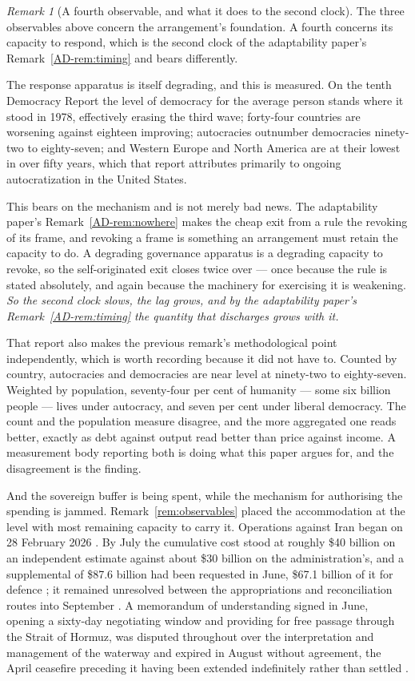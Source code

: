 \documentclass[11pt,a4paper]{article}
\theoremstyle{remark}
\newtheorem{remark}[definition]{Remark}
\begin{document}
\begin{remark}[A fourth observable, and what it does to the second clock]\label{rem:governance}
The three observables above concern the arrangement's foundation. A fourth concerns its capacity to
respond, which is the second clock of the adaptability paper's Remark~\ref{AD-rem:timing} and bears differently.

The response apparatus is itself degrading, and this is measured. On the tenth Democracy Report
\citep{vdem2026} the level of democracy for the average person stands where it stood in 1978, effectively
erasing the third wave; forty-four countries are worsening against eighteen improving; autocracies
outnumber democracies ninety-two to eighty-seven; and Western Europe and North America are at their
lowest in over fifty years, which that report attributes primarily to ongoing autocratization in the
United States.

This bears on the mechanism and is not merely bad news. The adaptability paper's Remark~\ref{AD-rem:nowhere} makes the cheap
exit from a rule the revoking of its frame, and revoking a frame is something an arrangement must retain
the capacity to do. A degrading governance apparatus is a degrading capacity to revoke, so the
self-originated exit closes twice over --- once because the rule is stated absolutely, and again because
the machinery for exercising it is weakening. \emph{So the second clock slows, the lag grows, and by
the adaptability paper's Remark~\ref{AD-rem:timing} the quantity that discharges grows with it.}

That report also makes the previous remark's methodological point independently, which is worth
recording because it did not have to. Counted by country, autocracies and democracies are near level at
ninety-two to eighty-seven. Weighted by population, seventy-four per cent of humanity --- some six
billion people --- lives under autocracy, and seven per cent under liberal democracy. The count and
the population measure disagree, and the more aggregated one reads better, exactly as debt against
output read better than price against income. A measurement body reporting both is doing what this paper
argues for, and the disagreement is the finding.

And the sovereign buffer is being spent, while the mechanism for authorising the spending is
jammed. Remark~\ref{rem:observables} placed the accommodation at the level with most remaining capacity
to carry it. Operations against Iran began on 28 February 2026 \citep{crs2026}. By July the cumulative
cost stood at roughly \$40 billion on an independent estimate against about \$30 billion on the
administration's, and a supplemental of \$87.6 billion had been requested in June, \$67.1 billion of it
for defence \citep{csis2026}; it remained unresolved between the appropriations and reconciliation routes
into September \citep{csistracking2026}. A memorandum of understanding signed in June, opening a
sixty-day negotiating window and providing for free passage through the Strait of Hormuz, was disputed
throughout over the interpretation and management of the waterway and expired in August without
agreement, the April ceasefire preceding it having been extended indefinitely rather than
settled \citep{hormuz2026}.


\end{remark}
\end{document}
